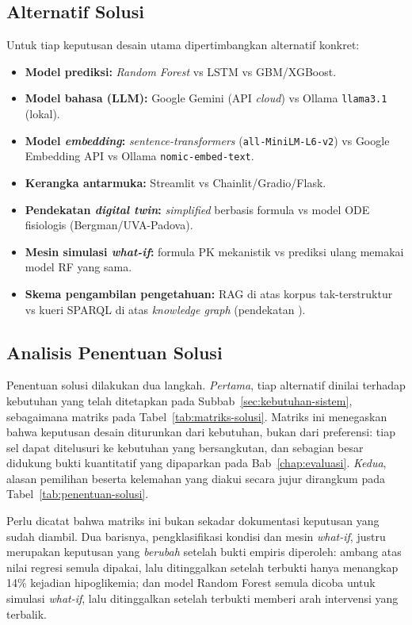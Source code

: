 \subsection{Alternatif Solusi}
Untuk tiap keputusan desain utama dipertimbangkan alternatif konkret:
\begin{itemize}
    \item \textbf{Model prediksi:} \emph{Random Forest} vs LSTM vs GBM/XGBoost.
    \item \textbf{Model bahasa (LLM):} Google Gemini (API \emph{cloud}) vs Ollama \texttt{llama3.1} (lokal).
    \item \textbf{Model \emph{embedding}:} \emph{sentence-transformers} (\texttt{all-MiniLM-L6-v2}) vs Google Embedding API vs Ollama \texttt{nomic-embed-text}.
    \item \textbf{Kerangka antarmuka:} Streamlit vs Chainlit/Gradio/Flask.
    \item \textbf{Pendekatan \emph{digital twin}:} \emph{simplified} berbasis formula vs model ODE fisiologis (Bergman/UVA-Padova).
    \item \textbf{Mesin simulasi \emph{what-if}:} formula PK mekanistik vs prediksi ulang memakai model RF yang sama.
    \item \textbf{Skema pengambilan pengetahuan:} RAG di atas korpus tak-terstruktur vs kueri SPARQL di atas \emph{knowledge graph} (pendekatan \textcite{rad2024}).
\end{itemize}

\subsection{Analisis Penentuan Solusi}
Penentuan solusi dilakukan dua langkah. \emph{Pertama}, tiap alternatif dinilai terhadap kebutuhan yang telah ditetapkan pada Subbab~\ref{sec:kebutuhan-sistem}, sebagaimana matriks pada Tabel~\ref{tab:matriks-solusi}. Matriks ini menegaskan bahwa keputusan desain diturunkan dari kebutuhan, bukan dari preferensi: tiap sel dapat ditelusuri ke kebutuhan yang bersangkutan, dan sebagian besar didukung bukti kuantitatif yang dipaparkan pada Bab~\ref{chap:evaluasi}. \emph{Kedua}, alasan pemilihan beserta kelemahan yang diakui secara jujur dirangkum pada Tabel~\ref{tab:penentuan-solusi}.



Perlu dicatat bahwa matriks ini bukan sekadar dokumentasi keputusan yang sudah diambil. Dua barisnya, pengklasifikasi kondisi dan mesin \emph{what-if}, justru merupakan keputusan yang \emph{berubah} setelah bukti empiris diperoleh: ambang atas nilai regresi semula dipakai, lalu ditinggalkan setelah terbukti hanya menangkap 14\% kejadian hipoglikemia; dan model Random Forest semula dicoba untuk simulasi \emph{what-if}, lalu ditinggalkan setelah terbukti memberi arah intervensi yang terbalik.

